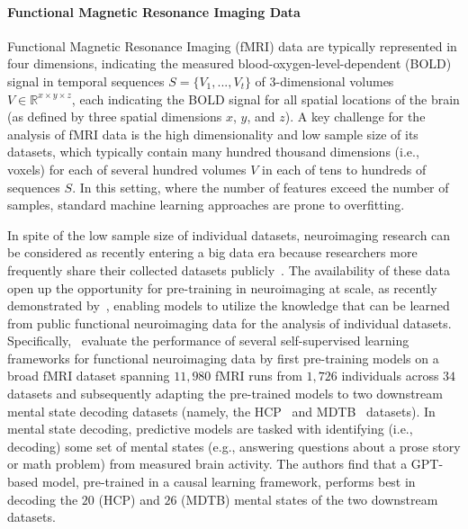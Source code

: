 \paragraph{Functional Magnetic Resonance Imaging Data}

Functional Magnetic Resonance Imaging (fMRI) data are typically represented in four dimensions, indicating the measured blood-oxygen-level-dependent (BOLD) signal in temporal sequences $S = \{V_1, ..., V_t\}$ of 3-dimensional volumes $V \in \mathbb{R}^{x \times y \times z}$, each indicating the BOLD signal for all spatial locations of the brain (as defined by three spatial dimensions $x$, $y$, and $z$). A key challenge for the analysis of fMRI data is the high dimensionality and low sample size of its datasets, which typically contain many hundred thousand dimensions (i.e., voxels) for each of several hundred volumes $V$ in each of tens to hundreds of sequences $S$. In this setting, where the number of features exceed the number of samples, standard machine learning approaches are prone to overfitting.

In spite of the low sample size of individual datasets, neuroimaging research can be considered as recently entering a big data era because researchers more frequently share their collected datasets publicly~\citep{markiewicz_2021_openneuro}. The availability of these data open up the opportunity for pre-training in neuroimaging at scale, as recently demonstrated by~\citep{thomas_fmri_2022}, enabling models to utilize the knowledge that can be learned from public functional neuroimaging data for the analysis of individual datasets. Specifically,~\citep{thomas_fmri_2022} evaluate the performance of several self-supervised learning frameworks for functional neuroimaging data by first pre-training models on a broad fMRI dataset spanning $11,980$ fMRI runs from $1,726$ individuals across $34$ datasets and subsequently adapting the pre-trained models to two downstream mental state decoding datasets (namely, the HCP~\citep{van_2013_wu} and MDTB~\citep{king_2019_functional} datasets). In mental state decoding, predictive models are tasked with identifying (i.e., decoding) some set of mental states (e.g., answering questions about a prose story or math problem) from measured brain activity. The authors find that a GPT-based model, pre-trained in a causal learning framework, performs best in decoding the $20$ (HCP) and $26$ (MDTB) mental states of the two downstream datasets.

